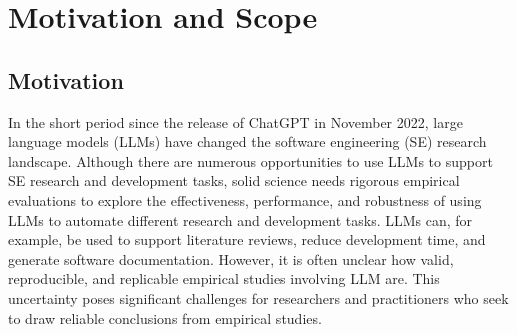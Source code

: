 



\section{Motivation and Scope}

\subsection{Motivation}

In the short period since the release of ChatGPT in November 2022, large language models (LLMs) have changed the software engineering (SE) research landscape.
Although there are numerous opportunities to use LLMs to support SE research and development tasks, solid science needs rigorous empirical evaluations to explore the effectiveness, performance, and robustness of using LLMs to automate different research and development tasks.
LLMs can, for example, be used to support literature reviews, reduce development time, and generate software documentation.
However, it is often unclear how valid, reproducible, and replicable empirical studies involving LLM are.
This uncertainty poses significant challenges for researchers and practitioners who seek to draw reliable conclusions from empirical studies.

